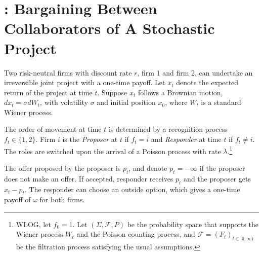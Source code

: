 \documentclass[11pt]{elegantbook}
\begin{document}
\chapter{\cite{ning2023bargaining}: Bargaining Between Collaborators of A Stochastic Project}
Two risk-neutral firms with discount rate $r$, firm 1 and firm 2, can undertake an irreversible joint project with a one-time payoff. Let $x_t$ denote the expected return of the project at time $t$. Suppose $x_t$ follows a Brownian motion, $dx_t=\sigma dW_t$, with volatility $\sigma$ and initial position $x_0$, where $W_t$ is a standard Wiener process.

The order of movement at time $t$ is determined by a recognition process $f_t\in\{1,2\}$. Firm $i$ is the \textit{Proposer} at $t$ if $f_t=i$ and \textit{Responder} at time $t$ if $f_t\neq i$. The roles are switched upon the arrival of a Poisson process with rate $\lambda$.\footnote{WLOG, let $f_0=1$. Let $(\Sigma, \mathcal{F}, P)$ be the probability space that supports the Wiener process $W_t$ and the Poisson counting process, and $\mathcal{F} = (F_t)_{t\in[0,\infty)}$ be the filtration process satisfying the usual assumptions.}

The offer proposed by the proposer is $p_t$, and denote $p_t=-\infty$ if the proposer does not make an offer. If accepted, responder receives $p_t$ and the proposer gets $x_t-p_t$. The responder can choose an outside option, which gives a one-time payoff of $\omega$ for both firms.













































































\end{document}
